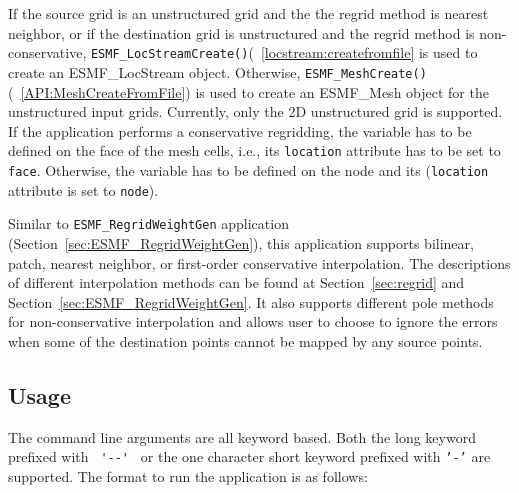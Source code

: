 If the source grid is an unstructured grid and the the regrid method is nearest neighbor, or if the destination grid 
is unstructured and the regrid method is non-conservative, {\tt ESMF\_LocStreamCreate()}(~\ref{locstream:createfromfile} is used to create an ESMF\_LocStream object.  Otherwise,
{\tt ESMF\_MeshCreate()}(~\ref{API:MeshCreateFromFile}) is used to create an ESMF\_Mesh object for the unstructured 
input grids.  Currently, only the 2D unstructured grid is supported.
If the application performs a conservative regridding, the variable has to be defined on the face of the mesh cells, i.e., its {\tt location} attribute has to be set to {\tt face}.  Otherwise, the variable has to be 
defined on the node and its ({\tt location} attribute is set to {\tt node}).

Similar to {\tt ESMF\_RegridWeightGen} application (Section~\ref{sec:ESMF_RegridWeightGen}), this application supports
bilinear, patch, nearest neighbor, or first-order conservative interpolation. The descriptions of different 
interpolation methods can be found at Section~\ref{sec:regrid} and Section~\ref{sec:ESMF_RegridWeightGen}. 
It also supports different pole methods for non-conservative interpolation and allows user to choose to 
ignore the errors when some of the destination points cannot be mapped by any source points. 

\subsection{Usage}\label{sec:fileregridusage}

The command line arguments are all keyword based.  Both the long keyword prefixed with \verb+ '--' + or the
one character short keyword prefixed with {\tt '-'} are supported.  The format to run the application is
as follows:

